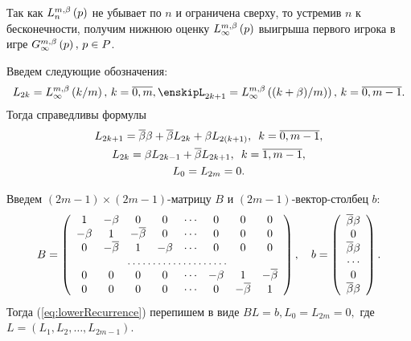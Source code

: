 Так как $\lowerBound[n]{p}$ не убывает по $n$ и ограничена сверху, то устремив
$n$ к бесконечности, получим нижнюю оценку $\lowerBound{p}$ выигрыша первого
игрока в игре $\infiniteGame{p}, \, p \in P$.

Введем следующие обозначения:
\[
  L_{2k} = \lowerBound{k/m}, \, k = \overline{0,m}, \enskip%
  L_{2k+1} = \lowerBound{(k+\Co)/m)}, \, k = \overline{0,m-1}.
\]
Тогда справедливы формулы
\begin{equation}
  \label{eq:lowerRecurrence}
  \begin{gathered}
    L_{2k+1} = \DCo\Co + \DCo L_{2k} + \Co L_{2(k+1)}, \enskip k = \overline{0, m-1},\\
    L_{2k} = \Co L_{2k-1} + \DCo L_{2k+1}, \enskip k = \overline{1, m-1},\\
    L_0 = L_{2m} = 0.
  \end{gathered}
\end{equation}

Введем $(2m-1)\times(2m-1)$-матрицу $B$ и $(2m-1)$-вектор-столбец $b$:
\begin{equation*}
  B =
  \left(
    \begin{array}{cccccccc}
      1      & -\Co  & 0       & 0      & \cdots & 0      & 0       & 0       \\
      -\Co & 1       & -\DCo & 0      & \cdots & 0      & 0       & 0       \\
      0      & -\DCo & 1       & -\Co & \cdots & 0      & 0       & 0       \\
      \hdotsfor{8}                                                              \\
      0      & 0       & 0       & 0      & \cdots & -\Co & 1       & -\DCo \\
      0      & 0       & 0       & 0      & \cdots & 0      & -\DCo & 1 
    \end{array}
  \right),\quad
  b = \left(
    \begin{array}{c}
      \DCo\Co \\
      0           \\
      \DCo\Co \\
      \cdots      \\
      0           \\
      \DCo\Co
    \end{array}
  \right).
\end{equation*}
Тогда (\ref{eq:lowerRecurrence}) перепишем в виде $ BL = b, L_0 = L_{2m} = 0, $
где $L = (L_1, L_2, \ldots, L_{2m-1})$.

